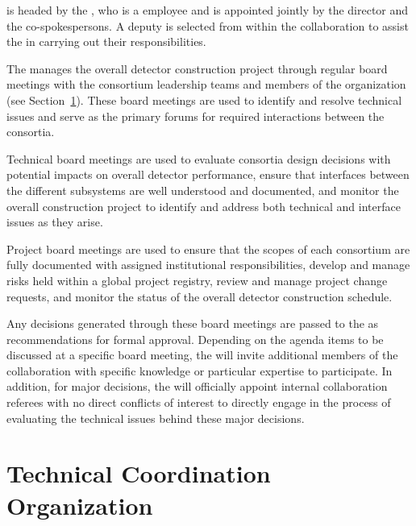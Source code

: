  is headed by the , who is a 
employee and is appointed jointly by the  director 
and the  co-spokespersons.  A deputy  
is selected from within the collaboration to assist the 
 in carrying out their responsibilities.

The  manages the overall detector construction project
through regular board meetings with the consortium leadership teams 
and members of the  organization (see Section~\ref{sec:tco}).  
These board meetings are used to identify and resolve technical issues
and serve as the primary forums for required interactions between the 
consortia.

Technical board meetings are used to evaluate consortia design
decisions with potential impacts on overall detector performance,
ensure that interfaces between the different subsystems are well
understood and documented, and monitor the overall construction
project to identify and address both technical and interface 
issues as they arise.

Project board meetings are used to ensure that the scopes of 
each consortium are fully documented with assigned institutional
responsibilities, develop and manage risks held within a global
project registry, review and manage project change requests, and
monitor the status of the overall detector construction schedule.

Any decisions generated through these board meetings are passed to the
  as recommendations for formal approval.
Depending on the agenda items to be discussed at a specific board
meeting, the  will invite additional members of the
collaboration with specific knowledge or particular expertise to
participate.  In addition, for major decisions, the 
will officially appoint internal collaboration referees with no direct
conflicts of interest to directly engage in the process of evaluating
the technical issues behind these major decisions.

\section{Technical Coordination Organization}
\label{sec:tco}

